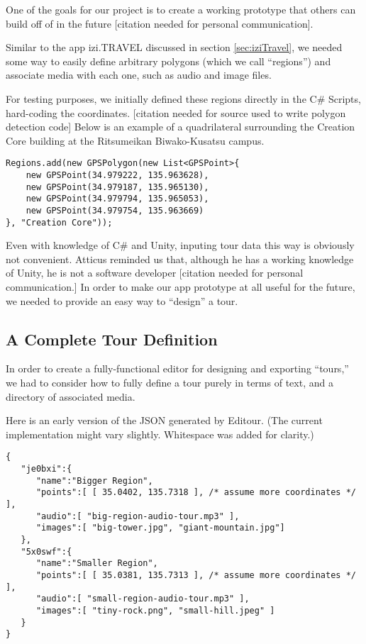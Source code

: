 \documentclass[a4paper, 10pt, american]{article}
\begin{document}
One of the goals for our project is to create a working prototype that others
can build off of in the future [citation needed for personal communication].

Similar to the app izi.TRAVEL discussed in section \ref{sec:iziTravel}, we
needed some way to easily define arbitrary polygons (which we call ``regions'')
and associate media with each one, such as audio and image files.

For testing purposes, we initially defined these regions directly in the C\#
Scripts, hard-coding the coordinates. [citation needed for source used to
write polygon detection code] Below is an example of a quadrilateral
surrounding the Creation Core building at the Ritsumeikan Biwako-Kusatsu
campus.

\begin{verbatim}
Regions.add(new GPSPolygon(new List<GPSPoint>{
    new GPSPoint(34.979222, 135.963628),
    new GPSPoint(34.979187, 135.965130),
    new GPSPoint(34.979794, 135.965053),
    new GPSPoint(34.979754, 135.963669)
}, "Creation Core"));
\end{verbatim}

Even with knowledge of C\# and Unity, inputing tour data this way is obviously
not convenient. Atticus reminded us that, although he has a working knowledge
of Unity, he is not a software developer [citation needed for personal
communication.] In order to make our app prototype at all useful for the
future, we needed to provide an easy way to ``design'' a tour.

\subsection{A Complete Tour Definition}
\label{sec:tourDefinition}

In order to create a fully-functional editor for designing and exporting
``tours,'' we had to consider how to fully define a tour purely in terms
of text, and a directory of associated media.

Here is an early version of the JSON generated by Editour. (The current
implementation might vary slightly. Whitespace was added for clarity.)

\begin{verbatim}
{
   "je0bxi":{
      "name":"Bigger Region",
      "points":[ [ 35.0402, 135.7318 ], /* assume more coordinates */ ],
      "audio":[ "big-region-audio-tour.mp3" ],
      "images":[ "big-tower.jpg", "giant-mountain.jpg"]
   },
   "5x0swf":{
      "name":"Smaller Region",
      "points":[ [ 35.0381, 135.7313 ], /* assume more coordinates */ ],
      "audio":[ "small-region-audio-tour.mp3" ],
      "images":[ "tiny-rock.png", "small-hill.jpeg" ]
   }
}
\end{verbatim}
\end{document}
